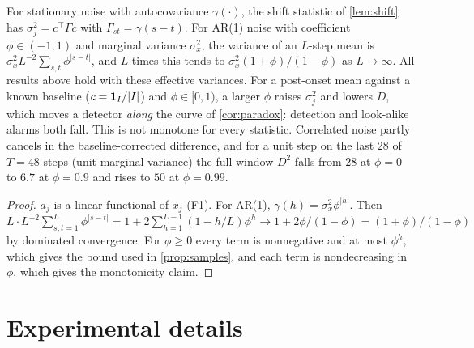 \begin{lemma}\label{lem:ar}
For stationary noise with autocovariance $\gamma(\cdot)$, the shift statistic of \cref{lem:shift} has $\sigma_j^2=c^\top\Gamma c$ with $\Gamma_{st}=\gamma(s-t)$. For AR(1) noise with coefficient $\phi\in(-1,1)$ and marginal variance $\sigma_x^2$, the variance of an $L$-step mean is $\sigma_x^2L^{-2}\sum_{s,t}\phi^{|s-t|}$, and $L$ times this tends to $\sigma_x^2(1+\phi)/(1-\phi)$ as $L\to\infty$. All results above hold with these effective variances. For a post-onset mean against a known baseline ($c=\mathbf{1}_I/|I|$) and $\phi\in[0,1)$, a larger $\phi$ raises $\sigma_j^2$ and lowers $D$, which moves a detector \emph{along} the curve of \cref{cor:paradox}: detection and look-alike alarms both fall. This is not monotone for every statistic. Correlated noise partly cancels in the baseline-corrected difference, and for a unit step on the last 28 of $T=48$ steps (unit marginal variance) the full-window $D^2$ falls from $28$ at $\phi=0$ to $6.7$ at $\phi=0.9$ and rises to $50$ at $\phi=0.99$.
\end{lemma}
\begin{proof}
$a_j$ is a linear functional of $x_j$ (F1). For AR(1), $\gamma(h)=\sigma_x^2\phi^{|h|}$. Then $L\cdot L^{-2}\sum_{s,t=1}^L\phi^{|s-t|}=1+2\sum_{h=1}^{L-1}(1-h/L)\phi^h\to1+2\phi/(1-\phi)=(1+\phi)/(1-\phi)$ by dominated convergence. For $\phi\ge0$ every term is nonnegative and at most $\phi^h$, which gives the bound used in \cref{prop:samples}, and each term is nondecreasing in $\phi$, which gives the monotonicity claim.
\end{proof}

\section{Experimental details}
\label{app:exp}
